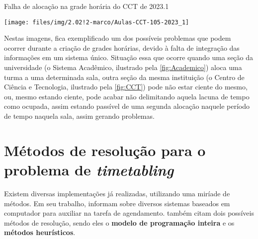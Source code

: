 \begin{MyCenteredFigure} \caption{Falha de alocação na grade horária do CCT de 2023.1} \label{fig:CCT}
  \texttt{[image: files/img/2.02!2-marco/Aulas-CCT-105-2023\_1]}
\end{MyCenteredFigure}

Nestas imagens, fica exemplificado um dos possíveis problemas que podem ocorrer durante a criação de grades horárias, devido à falta de integração das informações em um sistema único. Situação essa que ocorre quando uma seção da universidade (o Sistema Acadêmico, ilustrado pela \autoref{fig:Academico}) aloca uma turma a uma determinada sala, outra seção da mesma instituição (o Centro de Ciência e Tecnologia, ilustrado pela \autoref{fig:CCT}) pode não estar ciente do mesmo, ou, mesmo estando ciente, pode acabar não delimitando aquela lacuna de tempo como ocupada, assim estando passível de uma segunda alocação naquele período de tempo naquela sala, assim gerando problemas.

\section{Métodos de resolução para o problema de \textit{timetabling}} \label{sec:resolucao}                                                    %



Existem diversas implementações já realizadas, utilizando uma miríade de métodos. Em seu trabalho,  informam sobre diversos sistemas baseados em computador para auxiliar na tarefa de agendamento.  também citam dois possíveis métodos de resolução, sendo eles o \textbf{modelo de programação inteira} e os \textbf{métodos heurísticos}.

